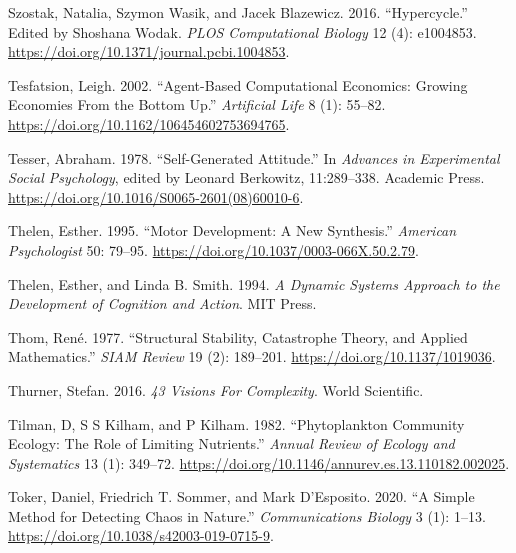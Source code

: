 \documentclass[
  a4paper,
  DIV=11,
  numbers=noendperiod]{scrreprt}
\newlength{\cslhangindent}
\newlength{\cslentryspacingunit} %
\newenvironment{CSLReferences}[2] %
 {%
  \setlength{\parindent}{0pt}
  \ifodd #1
  \let\oldpar\par
  \def\par{\hangindent=\cslhangindent\oldpar}
  \fi
  \setlength{\parskip}{#2\cslentryspacingunit}
 }%
 {}
\begin{document}
\begin{CSLReferences}{1}{0}
\leavevmode{}%
Szostak, Natalia, Szymon Wasik, and Jacek Blazewicz. 2016.
{``Hypercycle.''} Edited by Shoshana Wodak. \emph{PLOS Computational
Biology} 12 (4): e1004853.
\url{https://doi.org/10.1371/journal.pcbi.1004853}.

\leavevmode{}%
Tesfatsion, Leigh. 2002. {``Agent-{Based Computational Economics}:
{Growing Economies From} the {Bottom Up}.''} \emph{Artificial Life} 8
(1): 55--82. \url{https://doi.org/10.1162/106454602753694765}.

\leavevmode{}%
Tesser, Abraham. 1978. {``Self-{Generated Attitude}.''} In
\emph{Advances in {Experimental Social Psychology}}, edited by Leonard
Berkowitz, 11:289--338. {Academic Press}.
\url{https://doi.org/10.1016/S0065-2601(08)60010-6}.

\leavevmode{}%
Thelen, Esther. 1995. {``Motor Development: {A} New Synthesis.''}
\emph{American Psychologist} 50: 79--95.
\url{https://doi.org/10.1037/0003-066X.50.2.79}.

\leavevmode{}%
Thelen, Esther, and Linda B. Smith. 1994. \emph{A {Dynamic Systems
Approach} to the {Development} of {Cognition} and {Action}}. {MIT
Press}.

\leavevmode{}%
Thom, René. 1977. {``Structural {Stability}, {Catastrophe Theory}, and
{Applied Mathematics}.''} \emph{SIAM Review} 19 (2): 189--201.
\url{https://doi.org/10.1137/1019036}.

\leavevmode{}%
Thurner, Stefan. 2016. \emph{43 Visions For Complexity}. World
Scientific.

\leavevmode{}%
Tilman, D, S S Kilham, and P Kilham. 1982. {``Phytoplankton {Community
Ecology}: {The Role} of {Limiting Nutrients}.''} \emph{Annual Review of
Ecology and Systematics} 13 (1): 349--72.
\url{https://doi.org/10.1146/annurev.es.13.110182.002025}.

\leavevmode{}%
Toker, Daniel, Friedrich T. Sommer, and Mark D'Esposito. 2020. {``A
Simple Method for Detecting Chaos in Nature.''} \emph{Communications
Biology} 3 (1): 1--13. \url{https://doi.org/10.1038/s42003-019-0715-9}.


\end{CSLReferences}
\end{document}
